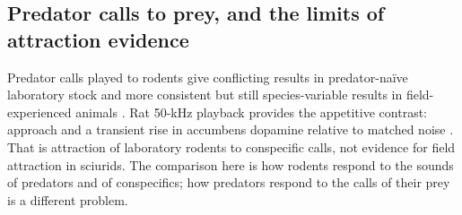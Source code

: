 \subsection{Predator calls to prey, and the limits of attraction evidence}
\label{sec:action-scope}

Predator calls played to rodents give conflicting results in predator-naïve laboratory stock \citep{HendrieNeill1991,KindermannEtAl2009} and more consistent but still species-variable results in field-experienced animals \citep{HendrieEtAl1998,EilamEtAl1999}. Rat 50-kHz playback provides the appetitive contrast: approach and a transient rise in accumbens dopamine relative to matched noise \citep{WilluhnEtAl2014,WohrSchwarting2007}. That is attraction of laboratory rodents to conspecific calls, not evidence for field attraction in sciurids. The comparison here is how rodents respond to the sounds of predators and of conspecifics; how predators respond to the calls of their prey is a different problem.


